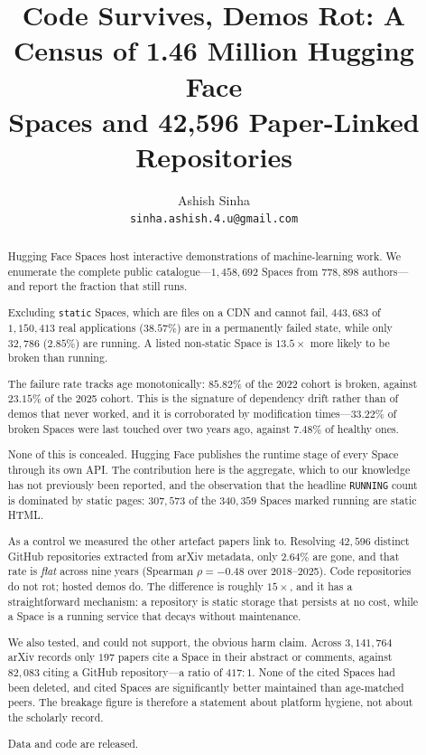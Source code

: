 \documentclass[11pt]{article}
\title{Code Survives, Demos Rot: A Census of 1.46 Million Hugging Face\\
Spaces and 42{,}596 Paper-Linked Repositories}
\author{Ashish Sinha\\
\texttt{sinha.ashish.4.u@gmail.com}}
\date{}
\begin{document}
\maketitle

\begin{abstract}
Hugging Face Spaces host interactive demonstrations of machine-learning work.
We enumerate the complete public catalogue---$1{,}458{,}692$ Spaces from
$778{,}898$ authors---and report the fraction that still runs.

Excluding \texttt{static} Spaces, which are files on a CDN and cannot fail,
$443{,}683$ of $1{,}150{,}413$ real applications ($38.57\%$) are in a
permanently failed state, while only $32{,}786$ ($2.85\%$) are running. A
listed non-static Space is $13.5\times$ more likely to be broken than running.

The failure rate tracks age monotonically: $85.82\%$ of the 2022 cohort is
broken, against $23.15\%$ of the 2025 cohort. This is the signature of
dependency drift rather than of demos that never worked, and it is corroborated
by modification times---$33.22\%$ of broken Spaces were last touched over two
years ago, against $7.48\%$ of healthy ones.

None of this is concealed. Hugging Face publishes the runtime stage of every
Space through its own API. The contribution here is the aggregate, which to our
knowledge has not previously been reported, and the observation that the
headline \texttt{RUNNING} count is dominated by static pages: $307{,}573$ of
the $340{,}359$ Spaces marked running are static HTML.

As a control we measured the other artefact papers link to. Resolving
$42{,}596$ distinct GitHub repositories extracted from arXiv metadata, only
$2.64\%$ are gone, and that rate is \emph{flat} across nine years
(Spearman $\rho = -0.48$ over 2018--2025). Code repositories do not rot;
hosted demos do. The difference is roughly $15\times$, and it has a
straightforward mechanism: a repository is static storage that persists at no
cost, while a Space is a running service that decays without maintenance.

We also tested, and could not support, the obvious harm claim. Across
$3{,}141{,}764$ arXiv records only $197$ papers cite a Space in their abstract
or comments, against $82{,}083$ citing a GitHub repository---a ratio of
$417{:}1$. None of the cited Spaces had been deleted, and cited Spaces are
significantly better maintained than age-matched peers. The breakage figure is
therefore a statement about platform hygiene, not about the scholarly record.

Data and code are released.
\end{abstract}
\end{document}
